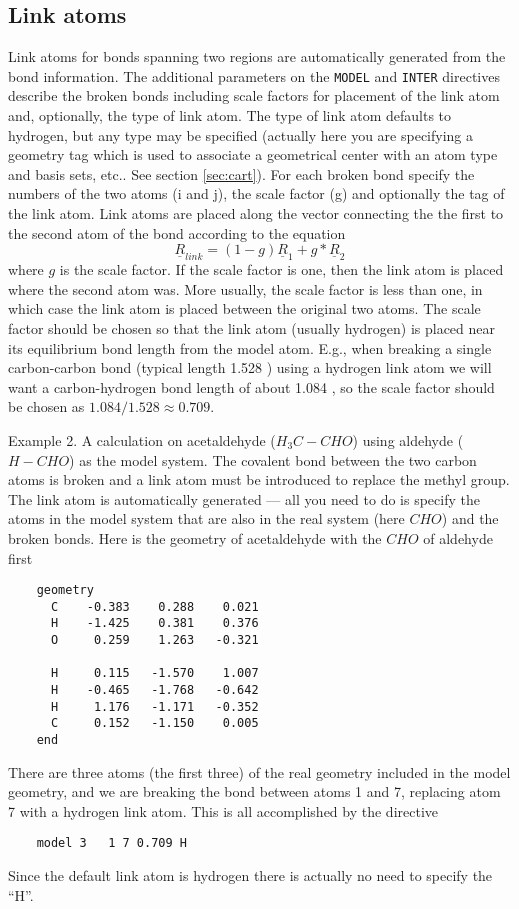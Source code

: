 \subsection{Link atoms}
Link atoms for bonds spanning two regions are automatically generated
from the bond information.  The additional parameters on the
\verb+MODEL+ and \verb+INTER+ directives describe the broken bonds
including scale factors for placement of the link atom 
and, optionally, the type of link atom.  The type of link atom
defaults to hydrogen, but any type may be specified (actually here you
are specifying a geometry tag which is used to associate a geometrical
center with an atom type and basis sets, etc..  See section 
\ref{sec:cart}).
For each broken bond specify the numbers of the two atoms (i and j),
the scale factor (g) and optionally the tag of the link atom.  Link
atoms are placed along the vector connecting the the first to the
second atom of the bond according to the equation
\begin{displaymath}
\underline{R}_{link} = (1-g)\underline{R}_{1} + g*\underline{R}_{2}
\end{displaymath}
where $g$ is the scale factor.  If the scale factor is one, then the
link atom is placed where the second atom was.  More usually, the
scale factor is less than one, in which case the link atom is placed
between the original two atoms.  The scale factor should be chosen so
that the link atom (usually hydrogen) is placed near its equilibrium
bond length from the model atom.  E.g., when breaking a single
carbon-carbon bond (typical length 1.528 {\angstroms}) using a hydrogen
link atom we will want a carbon-hydrogen bond length of about 1.084
{\angstroms}, so the scale factor should be chosen as $1.084/1.528
\approx 0.709$.

Example 2.  A calculation on acetaldehyde ($H_3C-CHO$) using aldehyde
($H-CHO$) as the model system. The covalent bond between the two
carbon atoms is broken and a link atom must be introduced to replace
the methyl group.  The link atom is automatically generated --- all
you need to do is specify the atoms in the model system that are also
in the real system (here $CHO$) and the broken bonds.  Here is the
geometry of acetaldehyde with the $CHO$ of aldehyde first
\begin{verbatim}
    geometry
      C    -0.383    0.288    0.021
      H    -1.425    0.381    0.376
      O     0.259    1.263   -0.321

      H     0.115   -1.570    1.007
      H    -0.465   -1.768   -0.642
      H     1.176   -1.171   -0.352
      C     0.152   -1.150    0.005
    end
\end{verbatim}
There are three atoms (the first three) of the real geometry included
in the model geometry, and we are breaking the bond between atoms 1
and 7, replacing atom 7 with a hydrogen link atom.  This is all
accomplished by the directive
\begin{verbatim}
    model 3   1 7 0.709 H
\end{verbatim}
Since the default link atom is hydrogen there is actually no need to
specify the ``H''.

